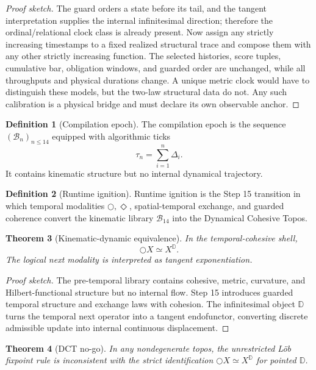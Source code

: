 \documentclass[11pt]{article}
\theoremstyle{plain}
\newtheorem{theorem}{Theorem}[section]
\theoremstyle{definition}
\newtheorem{definition}[theorem]{Definition}
\theoremstyle{remark}
\newenvironment{proofsketch}{\begin{proof}[Proof sketch]}{\end{proof}}
\newcommand{\B}{\mathcal{B}}
\newcommand{\Next}{\bigcirc}
\newcommand{\Eventually}{\Diamond}
\newcommand{\D}{\mathbb{D}}
\begin{document}
\begin{proofsketch}
The guard orders a state before its tail, and the tangent interpretation supplies the internal infinitesimal direction; therefore the ordinal/relational clock class is already present. Now assign any strictly increasing timestamps to a fixed realized structural trace and compose them with any other strictly increasing function. The selected histories, score tuples, cumulative bar, obligation windows, and guarded order are unchanged, while all throughputs and physical durations change. A unique metric clock would have to distinguish these models, but the two-law structural data do not. Any such calibration is a physical bridge and must declare its own observable anchor.
\end{proofsketch}

\begin{definition}[Compilation epoch]
The compilation epoch is the sequence \((\B_n)_{n\le14}\) equipped with algorithmic ticks
\[
\tau_n=\sum_{i=1}^{n}\Delta_i.
\]
It contains kinematic structure but no internal dynamical trajectory.
\end{definition}

\begin{definition}[Runtime ignition]
Runtime ignition is the Step 15 transition in which temporal modalities \(\Next,\Eventually\), spatial-temporal exchange, and guarded coherence convert the kinematic library \(\B_{14}\) into the Dynamical Cohesive Topos.
\end{definition}

\begin{theorem}[Kinematic-dynamic equivalence]
In the temporal-cohesive shell,
\[
\Next X\simeq X^{\D}.
\]
The logical next modality is interpreted as tangent exponentiation.
\end{theorem}

\begin{proofsketch}
The pre-temporal library contains cohesive, metric, curvature, and Hilbert-functional structure but no internal flow. Step 15 introduces guarded temporal structure and exchange laws with cohesion. The infinitesimal object \(\D\) turns the temporal next operator into a tangent endofunctor, converting discrete admissible update into internal continuous displacement.
\end{proofsketch}

\begin{theorem}[DCT no-go]
In any nondegenerate topos, the unrestricted L\"ob fixpoint rule is inconsistent with the strict identification \(\Next X\simeq X^{\D}\) for pointed \(\D\).
\end{theorem}
\end{document}

